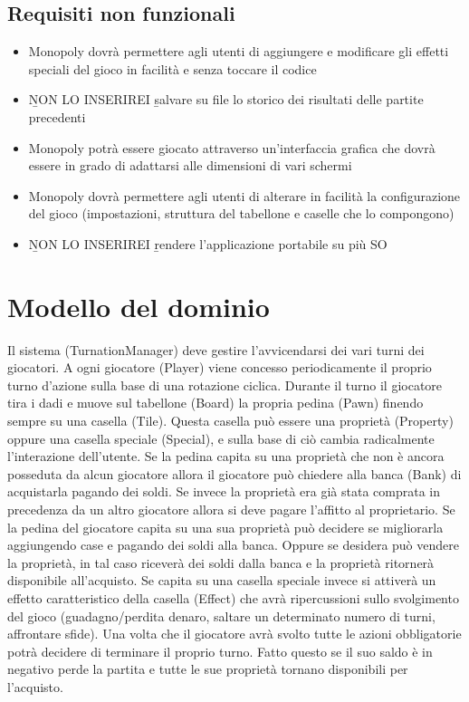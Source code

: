 \subsection*{Requisiti non funzionali}
\begin{itemize}
    \item 
    Monopoly dovrà permettere agli utenti di aggiungere e 
    modificare gli effetti speciali del gioco in facilità e senza toccare il codice
    \item \b NON LO INSERIREI \b salvare su file lo storico dei risultati delle partite precedenti
    \item Monopoly potrà essere giocato attraverso un'interfaccia grafica
    che dovrà essere in grado di adattarsi alle dimensioni di vari schermi
    \item 
    Monopoly dovrà permettere agli utenti di alterare in facilità la 
    configurazione del gioco (impostazioni, struttura del tabellone e caselle che lo compongono)
    \item \b NON LO INSERIREI \b rendere l’applicazione portabile su più SO
\end{itemize}

\section{Modello del dominio}
Il sistema (TurnationManager) deve gestire l’avvicendarsi dei vari turni dei giocatori. 
A ogni giocatore (Player) viene concesso periodicamente il proprio turno d’azione sulla base di una rotazione ciclica. 
Durante il turno il giocatore tira i dadi e muove sul tabellone (Board) la propria pedina (Pawn) finendo sempre su una casella (Tile).
Questa casella può essere una proprietà (Property) oppure una casella speciale (Special), 
e sulla base di ciò cambia radicalmente l’interazione dell’utente. 
Se la pedina capita su una proprietà che non è ancora posseduta da alcun giocatore allora 
il giocatore può chiedere alla banca (Bank) di acquistarla pagando dei soldi. 
Se invece la proprietà era già stata comprata in precedenza da un altro giocatore allora si 
deve pagare l'affitto al proprietario. 
Se la pedina del giocatore capita su una sua proprietà  
può decidere se migliorarla aggiungendo case e pagando dei soldi alla banca. 
Oppure se desidera può vendere la proprietà, in tal caso riceverà dei soldi dalla banca e la proprietà ritornerà
disponibile all'acquisto.
Se capita su una casella speciale invece si attiverà un effetto caratteristico della casella (Effect)
che avrà ripercussioni sullo svolgimento del gioco 
(guadagno/perdita denaro, saltare un determinato numero di turni, affrontare sfide).
Una volta che il giocatore avrà svolto tutte le azioni obbligatorie potrà decidere di terminare il proprio turno. 
Fatto questo se il suo saldo è in negativo perde la partita e tutte le sue proprietà tornano disponibili per l’acquisto. 




